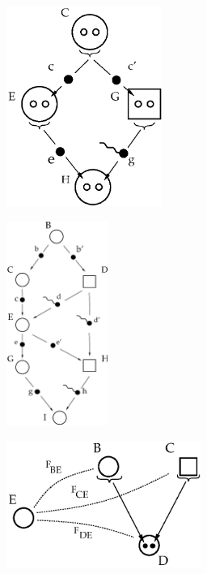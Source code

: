 \documentclass[bluish,slideColor,colorBG,pdf]{prosper}
\begin{document}
\begin{slide}[Replace]{}

\centerline{\includegraphics[width=2.0in]{fig5-3.ps}}

\end{slide}

\begin{slide}[Replace]{}

\centerline{\includegraphics[width=1.3in]{fig5-4.ps}}

\end{slide}

\begin{slide}[Replace]{}

\centerline{\includegraphics[width=2.5in]{fig5-5.ps}}

\end{slide}
\end{document}
